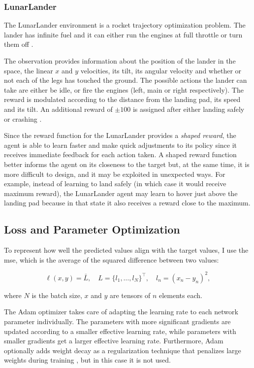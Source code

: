 \subsubsection{LunarLander} \label{subsubsec:lunar_lander}
The LunarLander environment is a rocket trajectory optimization problem. The lander has infinite fuel and it can either run the engines at full throttle or turn them off \cite{openai_gym}.

The observation provides information about the position of the lander in the space, the linear $x$ and $y$ velocities, its tilt, its angular velocity and whether or not each of the legs has touched the ground. The possible actions the lander can take are either be idle, or fire the engines (left, main or right respectively). The reward is modulated according to the distance from the landing pad, its speed and its tilt. An additional reward of $\pm 100$ is assigned after either landing safely or crashing \cite{farama_gymnasium}.

Since the reward function for the LunarLander provides a \textit{shaped reward}, the agent is able to learn faster and make quick adjustments to its policy since it receives immediate feedback for each action taken. A shaped reward function better informs the agent on its closeness to the target but, at the same time, it is more difficult to design, and it may be exploited in unexpected ways. For example, instead of learning to land safely (in which case it would receive maximum reward), the LunarLander agent may learn to hover just above the landing pad because in that state it also receives a reward close to the maximum.

\subsection{Loss and Parameter Optimization}
To represent how well the predicted values align with the target values, I use the \acrfull{mse}, which is the average of the squared difference between two values:

$$
\ell(x, y) = \bar{L}, \quad L = \{ l_1, \dots, l_N \}^\intercal, \quad l_n = (x_n - y_n)^2,
$$

where $N$ is the batch size, $x$ and $y$ are tensors of $n$ elements each.

The Adam optimizer takes care of adapting the learning rate to each network parameter individually. The parameters with more significant gradients are updated according to a smaller effective learning rate, while parameters with smaller gradients get a larger effective learning rate. Furthermore, Adam optionally adds weight decay as a regularization technique that penalizes large weights during training \cite{adam}, but in this case it is not used.

